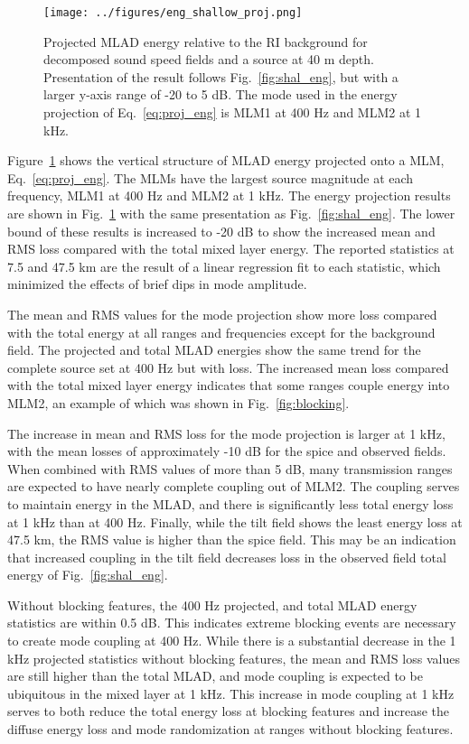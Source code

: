 \documentclass[preprint,NumberedRefs]{JASA}
\begin{document}
\begin{figure}
\texttt{[image: ../figures/eng\_shallow\_proj.png]}
    \caption{Projected MLAD energy relative to the RI background for decomposed sound speed fields and a source at 40 m depth. Presentation of the result follows Fig.~\ref{fig:shal_eng}, but with a larger y-axis range of -20 to 5 dB. The mode used in the energy projection of Eq.~\eqref{eq:proj_eng} is MLM1 at 400 Hz and MLM2 at 1 kHz.}
    \label{fig:shal_proj}
\end{figure}
Figure~\ref{fig:shal_proj} shows the vertical structure of MLAD energy projected onto a MLM, Eq.~\eqref{eq:proj_eng}. The MLMs have the largest source magnitude at each frequency, MLM1 at 400 Hz and MLM2 at 1 kHz. The energy projection results are shown in Fig.~\ref{fig:shal_proj} with the same presentation as Fig.~\ref{fig:shal_eng}. The lower bound of these results is increased to -20 dB to show the increased mean and RMS loss compared with the total mixed layer energy. The reported statistics at 7.5 and 47.5 km are the result of a linear regression fit to each statistic, which minimized the effects of brief dips in mode amplitude.

The mean and RMS values for the mode projection show more loss compared with the total energy at all ranges and frequencies except for the background field. The projected and total MLAD energies show the same trend for the complete source set at 400 Hz but with loss. The increased mean loss compared with the total mixed layer energy indicates that some ranges couple energy into MLM2, an example of which was shown in Fig.~\ref{fig:blocking}.

The increase in mean and RMS loss for the mode projection is larger at 1 kHz, with the mean losses of approximately -10 dB for the spice and observed fields. When combined with RMS values of more than 5 dB, many transmission ranges are expected to have nearly complete coupling out of MLM2. The coupling serves to maintain energy in the MLAD, and there is significantly less total energy loss at 1 kHz than at 400 Hz. Finally, while the tilt field shows the least energy loss at 47.5 km, the RMS value is higher than the spice field. This may be an indication that increased coupling in the tilt field decreases loss in the observed field total energy of Fig.~\ref{fig:shal_eng}.

Without blocking features, the 400 Hz projected, and total MLAD energy statistics are within 0.5 dB. This indicates extreme blocking events are necessary to create mode coupling at 400 Hz. While there is a substantial decrease in the 1 kHz projected statistics without blocking features, the mean and RMS loss values are still higher than the total MLAD, and mode coupling is expected to be ubiquitous in the mixed layer at 1 kHz. This increase in mode coupling at 1 kHz serves to both reduce the total energy loss at blocking features and increase the diffuse energy loss and mode randomization at ranges without blocking features.
\end{document}
